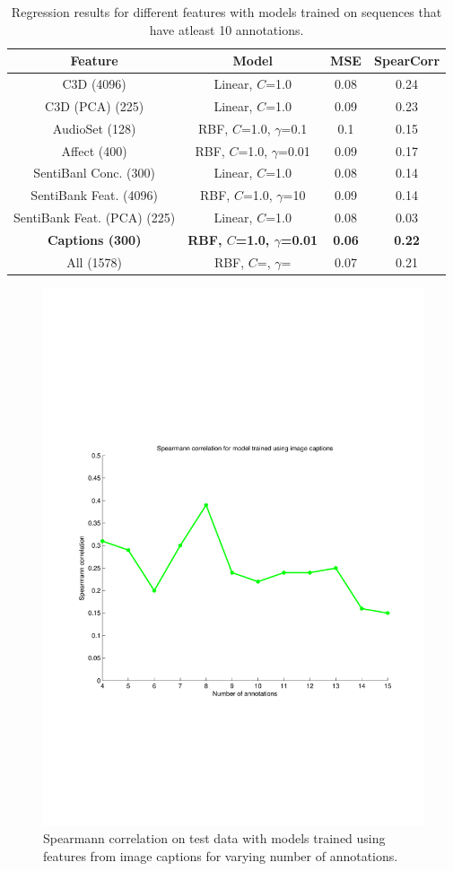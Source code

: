 \documentclass[sigconf]{acmart}
\begin{document}
\begin{table}[!ht]
\centering
    \begin{tabular}{| c | c | c | c |}
    \hline
				Feature& Model& MSE& SpearCorr\\ \hline
				C3D (4096)& Linear, $C$=1.0& 0.08& 0.24\\ \hline
				C3D (PCA) (225)& Linear, $C$=1.0& 0.09& 0.23\\ \hline
				AudioSet (128)& RBF, $C$=1.0, $\gamma$=0.1& 0.1& 0.15\\ \hline
				Affect (400)& RBF, $C$=1.0, $\gamma$=0.01& 0.09& 0.17\\ \hline
				SentiBanl Conc. (300)& Linear, $C$=1.0& 0.08& 0.14\\ \hline
				SentiBank Feat. (4096)& RBF, $C$=1.0, $\gamma$=10& 0.09& 0.14\\ \hline
				SentiBank Feat. (PCA) (225)& Linear, $C$=1.0& 0.08& 0.03\\ \hline
				\textbf{Captions (300)}& \textbf{RBF, $C$=1.0, $\gamma$=0.01}& \textbf{0.06}& \textbf{0.22}\\ \hline
				All (1578)& RBF, $C$=, $\gamma$=& 0.07& 0.21\\ \hline
    \end{tabular}		
		\caption{Regression results for different features with models trained on sequences that have atleast 10 annotations.}
		\label{res-10-ann}	
\end{table}

\begin{figure}[h]	  
  \centering
    \includegraphics[width=0.7\columnwidth]{figures/annotations.pdf}
		\caption{Spearmann correlation on test data with models trained using features from image captions for varying number of annotations.}
    \label{num-ann}
\end{figure}
\end{document}
